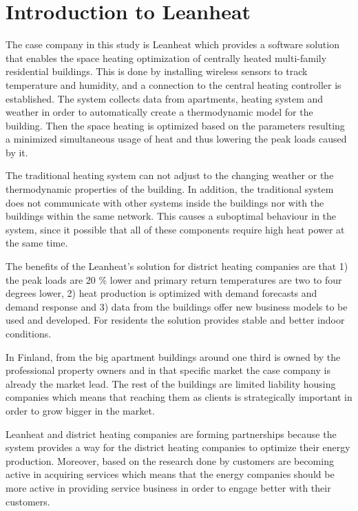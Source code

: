 \section{Introduction to Leanheat}

The case company in this study is Leanheat which provides a software solution that enables the space  heating optimization of centrally heated multi-family residential buildings. This is done by installing wireless sensors to track temperature and humidity, and a connection to the central heating controller is established. The system collects data from apartments, heating system and weather in order to automatically create a thermodynamic model for the building. Then the space heating is optimized based on the parameters resulting a minimized simultaneous usage of heat and thus lowering the peak loads caused by it. \parencite{LenheatArticle:2019}

The traditional heating system can not adjust to the changing weather or the thermodynamic properties of the building. In addition, the traditional system does not communicate with other systems inside the buildings nor with the buildings within the same network. This causes a suboptimal behaviour in the system, since it possible that all of these components require high heat power at the same time. \parencite{LenheatArticle:2019}

The benefits of the Leanheat's solution for district heating companies are that 1) the peak loads are 20 \% lower and primary return temperatures are two to four degrees lower, 2) heat production is optimized with demand forecasts and demand response and 3) data from the buildings offer new business models to be used and developed. For residents the solution provides stable and better indoor conditions. \parencite{LenheatArticle:2019}

In Finland, from the big apartment buildings around one third is owned by the professional property owners and in that specific market the case company is already the market lead. The rest of the buildings are limited liability housing companies which means that reaching them as clients is strategically important in order to grow bigger in the market.

Leanheat and district heating companies are forming partnerships because the system provides a way for the district heating companies to optimize their energy production. Moreover, based on the research done by \textcite{Energyindustry:2019} customers are becoming active in acquiring services which means that the energy companies should be more active in providing service business in order to engage better with their customers.

